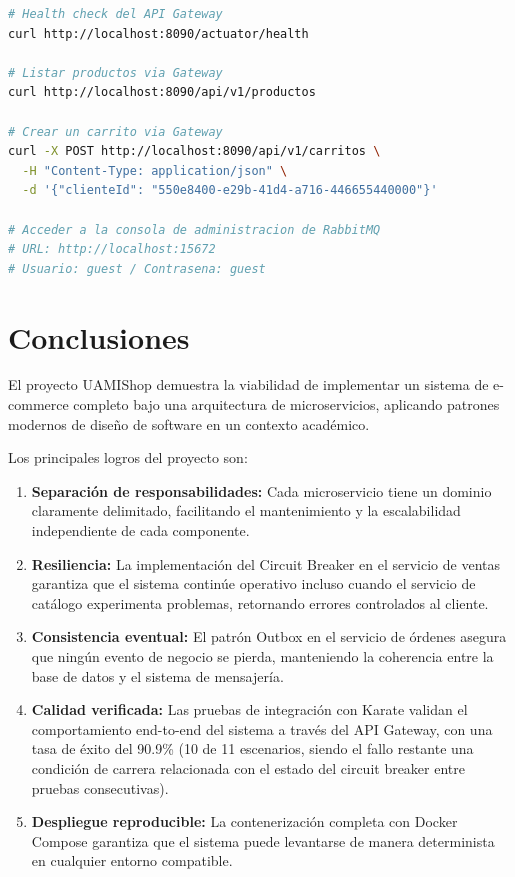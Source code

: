 \documentclass[12pt,a4paper]{article}
\begin{document}
\begin{lstlisting}[language=bash, caption={Verificaci\'on r\'apida del sistema}]
# Health check del API Gateway
curl http://localhost:8090/actuator/health

# Listar productos via Gateway
curl http://localhost:8090/api/v1/productos

# Crear un carrito via Gateway
curl -X POST http://localhost:8090/api/v1/carritos \
  -H "Content-Type: application/json" \
  -d '{"clienteId": "550e8400-e29b-41d4-a716-446655440000"}'

# Acceder a la consola de administracion de RabbitMQ
# URL: http://localhost:15672
# Usuario: guest / Contrasena: guest
\end{lstlisting}

\section{Conclusiones}

El proyecto UAMIShop demuestra la viabilidad de implementar un sistema de e-commerce
completo bajo una arquitectura de microservicios, aplicando patrones modernos de dise\~no
de software en un contexto acad\'emico.

Los principales logros del proyecto son:

\begin{enumerate}
  \item \textbf{Separaci\'on de responsabilidades:} Cada microservicio tiene un dominio
        claramente delimitado, facilitando el mantenimiento y la escalabilidad independiente
        de cada componente.

  \item \textbf{Resiliencia:} La implementaci\'on del Circuit Breaker en el servicio de
        ventas garantiza que el sistema contin\'ue operativo incluso cuando el servicio de
        cat\'alogo experimenta problemas, retornando errores controlados al cliente.

  \item \textbf{Consistencia eventual:} El patr\'on Outbox en el servicio de \'ordenes
        asegura que ning\'un evento de negocio se pierda, manteniendo la coherencia entre
        la base de datos y el sistema de mensajer\'ia.

  \item \textbf{Calidad verificada:} Las pruebas de integraci\'on con Karate validan el
        comportamiento end-to-end del sistema a trav\'es del API Gateway, con una tasa de
        \'exito del 90.9\% (10 de 11 escenarios, siendo el fallo restante una condici\'on
        de carrera relacionada con el estado del circuit breaker entre pruebas consecutivas).

  \item \textbf{Despliegue reproducible:} La contenerizaci\'on completa con Docker Compose
        garantiza que el sistema puede levantarse de manera determinista en cualquier
        entorno compatible.
\end{enumerate}
\end{document}
